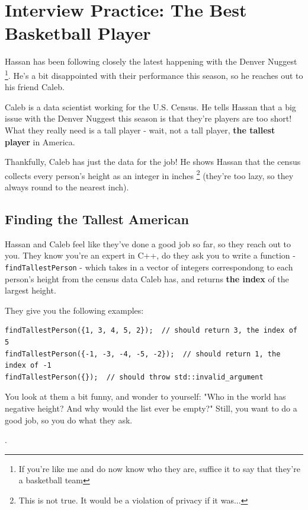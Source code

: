 \documentclass [12pt]{article}
\begin{document}
\pagebreak
\section{Interview Practice: The Best Basketball Player}
 Hassan has been following closely the latest happening with the Denver Nuggest \footnote{If you're like me and do now know who they are, suffice it to say that they're a basketball team}. He's a bit disappointed with their performance this season, so he reaches out to his friend Caleb. 

Caleb is a data scientist working for the U.S. Census. He tells Hassan that a big issue with the Denver Nuggest this season is that they're players are too short! What they really need is a tall player - wait, not a tall player, \textbf{the tallest player} in America.

Thankfully, Caleb has just the data for the job! He shows Hassan that the census collects every person's height as an integer in inches \footnote{This is not true. It would be a violation of privacy if it was...} (they're too lazy, so they always round to the nearest inch).


\subsection{Finding the Tallest American}
 Hassan and Caleb feel like they've done a good job so far, so they reach out to you. They know you're an expert in C++, do they ask you to write a function - \texttt{findTallestPerson} - which takes in a vector of integers correspondong to each person's height from the census data Caleb has, and returns \textbf{the index} of the largest height.

They give you the following examples:

\vspace{2em}
\begin{verbatim}
findTallestPerson({1, 3, 4, 5, 2});  // should return 3, the index of 5
findTallestPerson({-1, -3, -4, -5, -2});  // should return 1, the index of -1
findTallestPerson({});  // should throw std::invalid_argument
\end{verbatim}

You look at them a bit funny, and wonder to yourself: "Who in the world has negative height? And why would the list ever be empty?" Still, you want to do a good job, so you do what they ask.

.
\end{document}
